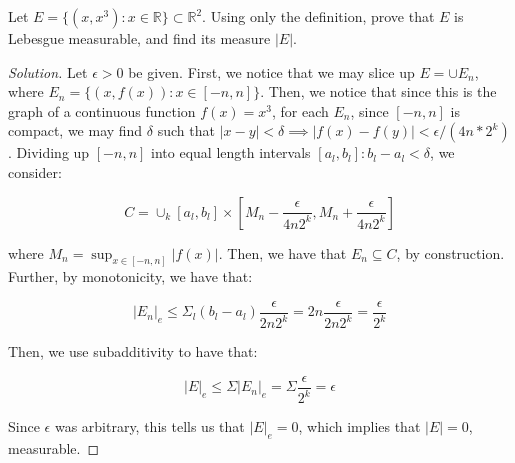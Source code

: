 \documentclass[10pt]{article}
\newenvironment{problem}[2][Problem]{\begin{trivlist}
\item[\hskip \labelsep {\bfseries #1}\hskip \labelsep {\bfseries #2.}]}{\end{trivlist}}
\begin{document}
 
\title{}
\author{Eric Tao\\
Math 235: Final exam}
\maketitle

\begin{problem}{1}

Let $E = \{ (x, x^3) : x \in \mathbb{R} \} \subset \mathbb{R}^2$. Using only the definition, prove that $E$ is Lebesgue measurable, and find its measure $|E|$.

\end{problem}
\begin{proof}[Solution]

Let $\epsilon > 0$ be given. First, we notice that we may slice up $E = \cup E_n$, where $E_n = \{ (x, f(x)) : x \in [-n,n] \}$. Then, we notice that since this is the graph of a continuous function $f(x) = x^3$, for each $E_n$, since $[-n,n]$ is compact, we may find $\delta$ such that $|x - y| < \delta \implies |f(x) - f(y)| < \epsilon/(4n * 2^k)$. Dividing up $[-n,n]$ into equal length intervals $[a_l,b_l] : b_l - a_l < \delta$, we consider:

$$ C = \cup_k [a_l,b_l] \times [M_n - \frac{\epsilon}{4n 2^k}, M_n + \frac{\epsilon}{4n 2^k}] $$

where $M_n = \sup_{x \in [-n,n]} |f(x)|$. Then, we have that $E_n \subseteq C$, by construction. Further, by monotonicity, we have that:

$$ |E_n|_e \leq \Sigma_l (b_l - a_l)  \frac{\epsilon}{2n 2^k} = 2n\frac{\epsilon}{2n 2^k} =\frac{\epsilon}{2^k} $$

Then, we use subadditivity to have that:

$$ |E|_e \leq \Sigma |E_n|_e  = \Sigma \frac{\epsilon}{2^k}  = \epsilon $$ 

Since $\epsilon$ was arbitrary, this tells us that $|E|_e = 0$, which implies that $|E| = 0$, measurable.

\end{proof}
\end{document}
